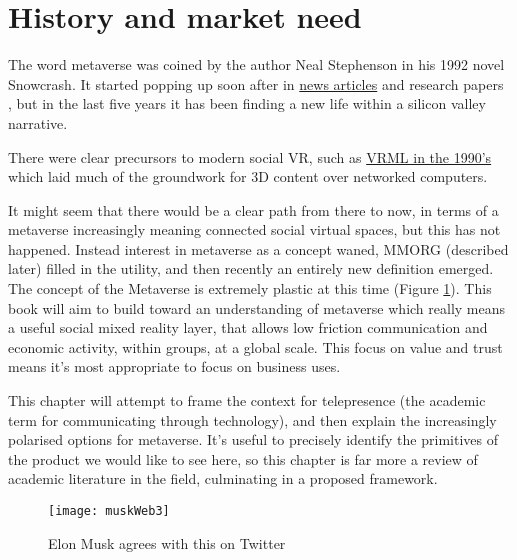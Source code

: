 
\section{History and market need}

The word metaverse was coined by the author Neal Stephenson in his 1992 novel Snowcrash. It started popping up soon after in \href{https://www.newscientist.com/article/mg14819994-000-how-to-build-a-metaverse/}{news articles} and research papers \cite{mclellan1993avatars}, but in the last five years it has been finding a new life within a silicon valley narrative.\par
There were clear precursors to modern social VR, such as \href{https://www.howtogeek.com/778554/remembering-vrml-the-metaverse-of-1995/}{VRML in the 1990's} which laid much of the groundwork for 3D content over networked computers.\par%
It might seem that there would be a clear path from there to now, in terms of a metaverse increasingly meaning connected social virtual spaces, but this has not happened. Instead interest in metaverse as a concept waned, MMORG (described later) filled in the utility, and then recently an entirely new definition emerged. The concept of the Metaverse is extremely plastic at this time (Figure \ref{fig:muskWeb3}). This book will aim to build toward an understanding of metaverse which really means a useful social mixed reality layer, that allows low friction communication and economic activity, within groups, at a global scale. This focus on value and trust means it's most appropriate to focus on business uses.\par
This chapter will attempt to frame the context for telepresence (the academic term for communicating through technology), and then explain the increasingly polarised options for metaverse. It's useful to precisely identify the primitives of the product we would like to see here, so this chapter is far more a review of academic literature in the field, culminating in a proposed framework.\par
\begin{figure}
  \centering
    \texttt{[image: muskWeb3]}
  \caption{Elon Musk agrees with this on Twitter}
  \label{fig:muskWeb3}
\end{figure}
    
